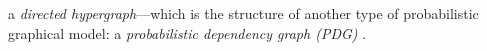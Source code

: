 \expandafter\commentout
{}%
%
a \emph{directed hypergraph}---which is the structure of
another type of probabilistic graphical model:
a
\emph{probabilistic dependency graph (PDG)} \citep{pdg-aaai,pdg-infer,one-true-loss}.


